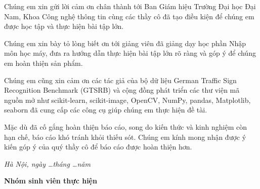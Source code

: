 
Chúng em xin gửi lời cảm ơn chân thành tới Ban Giám hiệu Trường Đại học Đại Nam, Khoa Công nghệ thông tin cùng các thầy cô đã tạo điều kiện để chúng em được học tập và thực hiện bài tập lớn.

Chúng em xin bày tỏ lòng biết ơn tới giảng viên \GiangVienHD{} đã giảng dạy học phần Nhập môn học máy, đưa ra hướng dẫn thực hiện bài tập lớn rõ ràng và góp ý để chúng em hoàn thiện sản phẩm.

Chúng em cũng xin cảm ơn các tác giả của bộ dữ liệu German Traffic Sign Recognition Benchmark (GTSRB) và cộng đồng phát triển các thư viện mã nguồn mở như scikit-learn, scikit-image, OpenCV, NumPy, pandas, Matplotlib, seaborn đã cung cấp các công cụ giúp chúng em thực hiện đề tài.

Mặc dù đã cố gắng hoàn thiện báo cáo, song do kiến thức và kinh nghiệm còn hạn chế, báo cáo khó tránh khỏi thiếu sót. Chúng em kính mong nhận được ý kiến góp ý của quý thầy cô để báo cáo được hoàn thiện hơn.

\vspace{1cm}

\begin{flushright}
\begin{minipage}{8cm}
\centering
\textit{Hà Nội, ngày \ldots tháng \ldots năm \Nam}

\vspace{0.5cm}

\textbf{Nhóm sinh viên thực hiện}

\vspace{2cm}

\textbf{\TenSinhVien}
\end{minipage}
\end{flushright}
